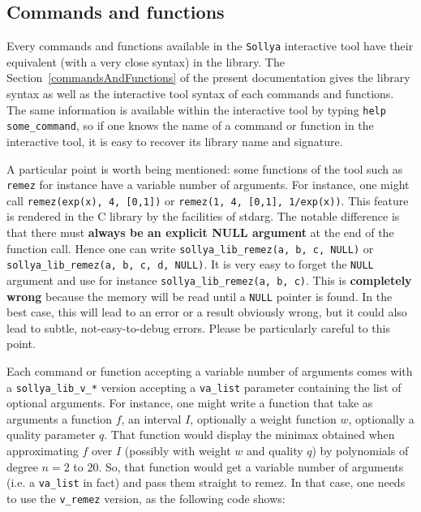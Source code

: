 \documentclass[a4paper]{article}
\newcommand{\sollya}{\texttt{Sollya}\xspace}
\begin{document}
\subsection{Commands and functions}
\label{library_commands_and_functions}
Every commands and functions available in the \sollya interactive tool have their equivalent (with a very close syntax) in the library. The Section~\ref{commandsAndFunctions} of the present documentation gives the library syntax as well as the interactive tool syntax of each commands and functions. The same information is available within the interactive tool by typing \texttt{help some\_command}, so if one knows the name of a command or function in the interactive tool, it is easy to recover its library name and signature.

A particular point is worth being mentioned: some functions of the tool such as \texttt{remez} for instance have a variable number of arguments. For instance, one might call \texttt{remez(exp(x), 4, [0,1])} or \texttt{remez(1, 4, [0,1], 1/exp(x))}. This feature is rendered in the C library by the facilities of stdarg. The notable difference is that there must \textbf{always be an explicit NULL argument} at the end of the function call. Hence one can write \texttt{sollya\_lib\_remez(a, b, c, NULL)} or \texttt{sollya\_lib\_remez(a, b, c, d, NULL)}. It is very easy to forget the \texttt{NULL} argument and use for instance \texttt{sollya\_lib\_remez(a, b, c)}. This is \textbf{completely wrong} because the memory will be read until a \texttt{NULL} pointer is found. In the best case, this will lead to an error or a result obviously wrong, but it could also lead to subtle, not-easy-to-debug errors. Please be particularly careful to this point.

Each command or function accepting a variable number of arguments comes with a \texttt{sollya\_lib\_v\_*} version accepting a \texttt{va\_list} parameter containing the list of optional arguments. For instance, one might write a function that take as arguments a function $f$, an interval $I$, optionally a weight function $w$, optionally a quality parameter $q$. That function would display the minimax obtained when approximating $f$ over $I$ (possibly with weight $w$ and quality $q$) by polynomials of degree $n=2$ to $20$. So, that function would get a variable number of arguments (i.e. a \texttt{va\_list} in fact) and pass them straight to remez. In that case, one needs to use the \texttt{v\_remez} version, as the following code shows:
\end{document}
